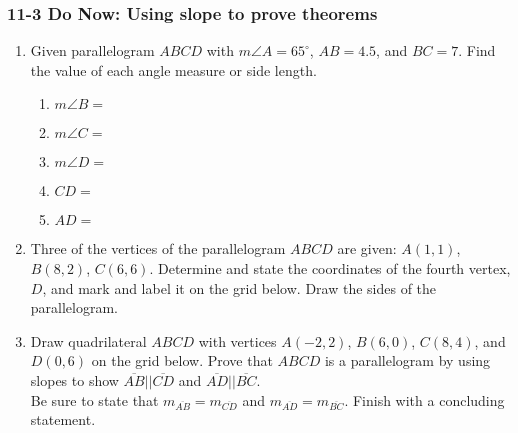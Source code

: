 \documentclass[12pt, twoside]{article}
\begin{document}
\subsubsection*{11-3 Do Now: Using slope to prove theorems}
  \begin{enumerate}

  \item Given parallelogram $ABCD$ with $m\angle A=65^\circ$, $AB=4.5$, and $BC=7$. Find the value of each angle measure or side length.
    \begin{enumerate}
      \item $m\angle B=$\vspace{0.5cm}
      \item $m\angle C=$\vspace{0.5cm}
      \item $m\angle D=$\vspace{0.5cm}
      \item $CD=$ \vspace{0.5cm}
      \item $AD=$ \vspace{0.5cm}
    \end{enumerate}

  \item Three of the vertices of the parallelogram $ABCD$ are given: $A(1, 1)$, $B(8,2)$, $C(6, 6)$. Determine and state the coordinates of the fourth vertex, $D$, and mark and label it on the grid below. Draw the sides of the parallelogram.
    \begin{center}
    \end{center}

\newpage

  \item Draw quadrilateral $ABCD$ with vertices $A(-2, 2)$, $B(6,0)$, $C(8,4)$, and $D(0,6)$ on the grid below. Prove that $ABCD$ is a parallelogram by using slopes to show $\overline{AB} || \overline{CD}$ and $\overline{AD} || \overline{BC}$. \\[0.5cm]
  Be sure to state that $m_{\overline{AB}}=m_{\overline{CD}}$ and $m_{\overline{AD}}=m_{\overline{BC}}$. Finish with a concluding statement.\\[1cm]

\end{enumerate}
\end{document}
